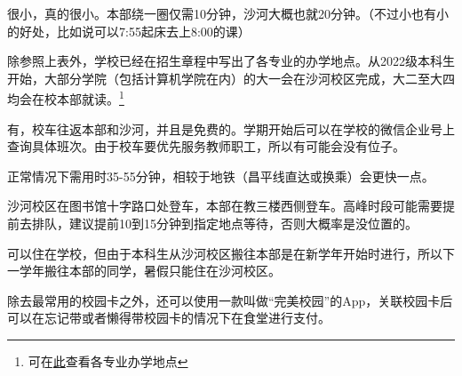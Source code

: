 
很小，真的很小。本部绕一圈仅需10分钟，沙河大概也就20分钟。{\small （不过小也有小的好处，比如说可以7:55起床去上8:00的课）}


除参照上表外，学校已经在招生章程中写出了各专业的办学地点。从2022级本科生开始，大部分学院（包括计算机学院在内）的大一会在沙河校区完成，大二至大四均会在校本部就读。\footnote{可在\href{https://zsb.bupt.edu.cn/info/1005/1992.htm}{此}查看各专业办学地点}


有，校车往返本部和沙河，并且是免费的。学期开始后可以在学校的微信企业号上查询具体班次。由于校车要优先服务教师职工，所以有可能会没有位子。

正常情况下需用时35-55分钟，相较于地铁（昌平线直达或换乘）会更快一点。

沙河校区在图书馆十字路口处登车，本部在教三楼西侧登车。高峰时段可能需要提前去排队，建议提前10到15分钟到指定地点等待，否则大概率是没位置的。


可以住在学校，但由于本科生从沙河校区搬往本部是在新学年开始时进行，所以下一学年搬往本部的同学，暑假只能住在沙河校区。


除去最常用的校园卡之外，还可以使用一款叫做“完美校园”的App，关联校园卡后可以在忘记带或者懒得带校园卡的情况下在食堂进行支付。
